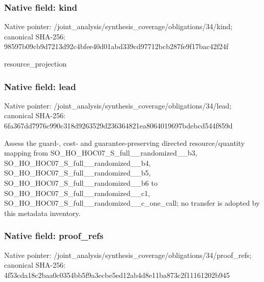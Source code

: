 \documentclass[10pt,a4paper]{article}
\begin{document}
\subsubsection{Native field: kind}
Native pointer: /joint\_\allowbreak{}analysis/synthesis\_\allowbreak{}coverage/obligations/34/kind; canonical SHA-256: 98597b09cb9d7213d92c4bfee40d01abd339cd97712bcb287fe9f17bac42f24f

\begingroup\raggedright\sloppy resource\_\allowbreak{}projection\par\endgroup

\subsubsection{Native field: lead}
Native pointer: /joint\_\allowbreak{}analysis/synthesis\_\allowbreak{}coverage/obligations/34/lead; canonical SHA-256: 6fa367dd7976c990c318d9263529d236364821ea8064019697bdebcd544f859d

\begingroup\raggedright\sloppy Assess the guard-,\allowbreak{} cost- and guarantee-preserving directed resource/\allowbreak{}quantity mapping from SO\_\allowbreak{}HO\_\allowbreak{}HOC07\_\allowbreak{}S\_\allowbreak{}full\_\allowbreak{}\_\allowbreak{}randomized\_\allowbreak{}\_\allowbreak{}b3,\allowbreak{} SO\_\allowbreak{}HO\_\allowbreak{}HOC07\_\allowbreak{}S\_\allowbreak{}full\_\allowbreak{}\_\allowbreak{}randomized\_\allowbreak{}\_\allowbreak{}b4,\allowbreak{} SO\_\allowbreak{}HO\_\allowbreak{}HOC07\_\allowbreak{}S\_\allowbreak{}full\_\allowbreak{}\_\allowbreak{}randomized\_\allowbreak{}\_\allowbreak{}b5,\allowbreak{} SO\_\allowbreak{}HO\_\allowbreak{}HOC07\_\allowbreak{}S\_\allowbreak{}full\_\allowbreak{}\_\allowbreak{}randomized\_\allowbreak{}\_\allowbreak{}b6 to SO\_\allowbreak{}HO\_\allowbreak{}HOC07\_\allowbreak{}S\_\allowbreak{}full\_\allowbreak{}\_\allowbreak{}randomized\_\allowbreak{}\_\allowbreak{}c1,\allowbreak{} SO\_\allowbreak{}HO\_\allowbreak{}HOC07\_\allowbreak{}S\_\allowbreak{}full\_\allowbreak{}\_\allowbreak{}randomized\_\allowbreak{}\_\allowbreak{}c\_\allowbreak{}one\_\allowbreak{}call;\allowbreak{} no transfer is adopted by this metadata inventory.\par\endgroup

\subsubsection{Native field: proof\_\allowbreak{}refs}
Native pointer: /joint\_\allowbreak{}analysis/synthesis\_\allowbreak{}coverage/obligations/34/proof\_\allowbreak{}refs; canonical SHA-256: 4f53cda18c2baa0c0354bb5f9a3ecbe5ed12ab4d8e11ba873c2f11161202b945
\end{document}

